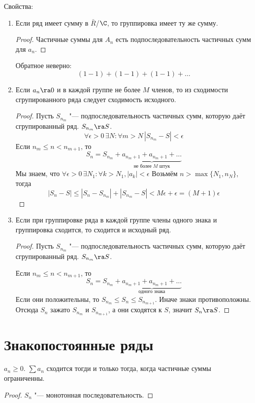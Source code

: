 Свойства:
\begin{enumerate}
\item
	Если ряд имеет сумму в $\bar R$/$\C$, то группировка имеет ту же сумму.
	\begin{proof}
		Частичные суммы для $A_n$ есть подпоследовательность частичных сумм для $a_n$.
	\end{proof}
	\begin{Rem}
		Обратное неверно:
		\[ (1 - 1) + (1 - 1) + (1 - 1) + \dots \]
	\end{Rem}

\item
	Если $a_n \ra 0$ и в каждой группе не более $M$ членов, то из сходимости сгрупированного ряда следует сходимость исходного.
	\begin{proof}
		Пусть $S_{n_m}$ "--- подпоследовательность частичных сумм, которую даёт сгрупированный ряд.
		$S_{n_m} \ra S$.
		\[
			\forall \epsilon>0\, \exists N\colon \forall m > N\, |S_{n_m} - S| < \epsilon
		\]
		Если $n_m \le n < n_{m+1}$, то
		\[ S_n = S_{n_m} + \underbrace{a_{n_m+1} + a_{n_m+1} + \dots}_{\text{не более $M$ штук}} \]
		Мы знаем, что $\forall \epsilon > 0\, \exists N_1 \colon \forall k > N_1, |a_k| < \epsilon$
		Возьмём $n > \max \{N_1, n_N\}$, тогда
		\[ |S_n - S| \le |S_n - S_{n_m}| + |S_{n_m} - S| < M\epsilon + \epsilon = (M+1)\epsilon \]
	\end{proof}

\item
	Если при группировке ряда в каждой группе члены одного знака и группировка сходится, то сходится и исходный ряд.
	\begin{proof}
		Пусть $S_{n_m}$ "--- подпоследовательность частичных сумм, которую даёт сгрупированный ряд.
		$S_{n_m} \ra S$.

		Если $n_m \le n < n_{m+1}$, то
		\[ S_n = S_{n_m} + \underbrace{a_{n_m+1} + a_{n_m+1} + \dots}_{\text{одного знака}} \]
		Если они положительны, то $S_{n_m} \le S_n \le S_{n_{m+1}}$.
		Иначе знаки противоположны.
		Отсюда $S_n$ зажато $S_{n_m}$ и $S_{n_{m+1}}$, а они сходятся к $S$, значит $S_n \ra S$.
	\end{proof}
\end{enumerate}

\section{Знакопостоянные ряды}

\begin{theorem}
	$a_n \ge 0$.
	$\sum a_n$ сходится тогди и только тогда, когда частичные суммы ограниченны.
\end{theorem}
\begin{proof}
	$S_n$ "--- монотонная последовательность.
\end{proof}

